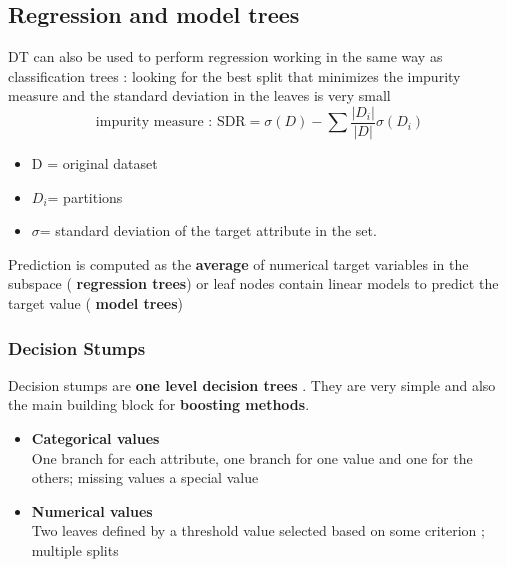 \subsection{Regression and model trees}
DT can also be used to perform regression working in the same way as classification trees : looking for the best split that minimizes the impurity measure and the standard deviation in the leaves is very small
$$ \text{impurity measure : SDR}= \sigma(D) - \sum \frac{|D_i|}{|D|}\sigma(D_i)$$
\begin{itemize}
\item D = original dataset
\item $D_i$= partitions
\item $\sigma$= standard deviation of the target attribute in the set.
\end{itemize}
Prediction is computed as the \textbf{average} of numerical target variables in the subspace ( \textbf{regression trees}) or leaf nodes contain linear models to predict the target value (\textbf{ model trees})

\subsubsection{Decision Stumps}
Decision stumps are \textbf{one level decision trees} . They are very simple and also the main building block for \textbf{boosting methods}.
\begin{itemize}
\item \textbf{Categorical values}\\
One branch for each attribute, one branch for one value and one for the others; missing values a special value
\item \textbf{Numerical values}\\
Two leaves defined by a threshold value selected based on some criterion ; multiple splits
\end{itemize}